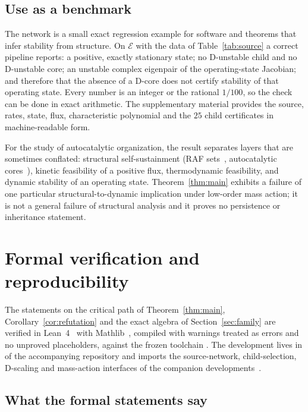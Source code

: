 \documentclass[11pt,a4paper]{article}
\theoremstyle{plain}
\theoremstyle{definition}
\theoremstyle{remark}
\begin{document}
\subsection{Use as a benchmark}\label{sec:benchmark}

The network is a small exact regression example for software and theorems that infer stability from structure. On $\mathcal E$ with the data of Table~\ref{tab:source} a correct pipeline reports: a positive, exactly stationary state; no D-unstable child and no D-unstable core; an unstable complex eigenpair of the operating-state Jacobian; and therefore that the absence of a D-core does not certify stability of that operating state. Every number is an integer or the rational $1/100$, so the check can be done in exact arithmetic. The supplementary material provides the source, rates, state, flux, characteristic polynomial and the $25$ child certificates in machine-readable form.

For the study of autocatalytic organization, the result separates layers that are sometimes conflated: structural self-sustainment (RAF sets~\cite{HordijkSteel2004}, autocatalytic cores~\cite{BlokhuisLacosteNghe2020}), kinetic feasibility of a positive flux, thermodynamic feasibility, and dynamic stability of an operating state. Theorem~\ref{thm:main} exhibits a failure of one particular structural-to-dynamic implication under low-order mass action; it is not a general failure of structural analysis and it proves no persistence or inheritance statement.

\section{Formal verification and reproducibility}\label{sec:formal}

The statements on the critical path of Theorem~\ref{thm:main}, Corollary~\ref{cor:refutation} and the exact algebra of Section~\ref{sec:family} are verified in Lean~4~\cite{Lean4} with Mathlib~\cite{Mathlib}, compiled with warnings treated as errors and no unproved placeholders, against the frozen toolchain . The development lives in  of the accompanying repository and imports the source-network, child-selection, D-scaling and mass-action interfaces of the companion developments~\cite{ParameterRich2026,KineticOrder2026}.

\subsection{What the formal statements say}
\end{document}
